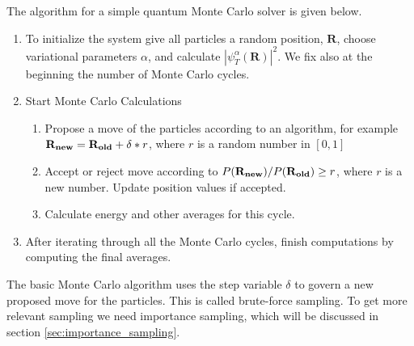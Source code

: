 		The algorithm for a simple quantum Monte Carlo solver is given below.
		\begin{enumerate}
			\item To initialize the system give all particles a random position, $\mathbf{R}$, choose variational parameters $\alpha$, and calculate $|\psi_{T}^{\alpha}(\mathbf{R})|^2$. We fix also at the beginning the  number of Monte Carlo cycles.
			\item Start Monte Carlo Calculations
				\begin{enumerate}
					\item Propose a move of the particles according to an algorithm, for example \newline \( \vb{R_{new}} = \vb{R_{old}} + \delta * r \), where $r$ is a random number in \([0,1]\)
					\item Accept or reject move according to \( P(\vb{R_{new}})/ P(\vb{R_{old}}) \ge r \), where $r$ is a new number. Update position values if accepted.
					\item Calculate energy and other averages for this cycle.
				\end{enumerate}
			\item After iterating through all the Monte Carlo cycles, finish computations by computing the final averages.
		\end{enumerate}

		The basic Monte Carlo algorithm uses the step variable $\delta$ to govern a new proposed move for the particles. This is called brute-force sampling. To get more relevant sampling we need importance sampling, which will be discussed in section \ref{sec:importance_sampling}.

